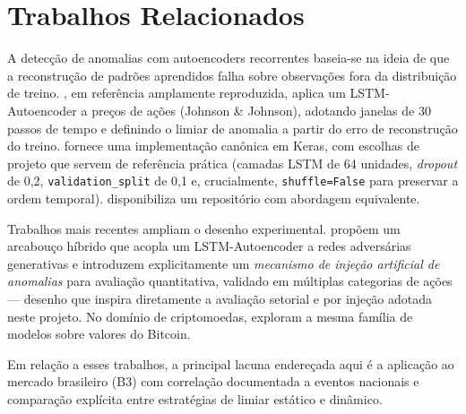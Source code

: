 \section{Trabalhos Relacionados}

A detecção de anomalias com autoencoders recorrentes baseia-se na ideia de que a
reconstrução de padrões aprendidos falha sobre observações fora da distribuição de
treino. \citet{li2020lstm}, em referência amplamente reproduzida, aplica um
LSTM-Autoencoder a preços de ações (Johnson \& Johnson), adotando janelas de 30 passos
de tempo e definindo o limiar de anomalia a partir do erro de reconstrução do treino.
\citet{valkov2019lstm} fornece uma implementação canônica em Keras, com escolhas de
projeto que servem de referência prática (camadas LSTM de 64 unidades, \emph{dropout}
de 0{,}2, \texttt{validation\_split} de 0{,}1 e, crucialmente, \texttt{shuffle=False}
para preservar a ordem temporal). \citet{petrovic2019lstm} disponibiliza um repositório
com abordagem equivalente.

Trabalhos mais recentes ampliam o desenho experimental. \citet{liu2025robust} propõem um
arcabouço híbrido que acopla um LSTM-Autoencoder a redes adversárias generativas e
introduzem explicitamente um \emph{mecanismo de injeção artificial de anomalias} para
avaliação quantitativa, validado em múltiplas categorias de ações --- desenho que
inspira diretamente a avaliação setorial e por injeção adotada neste projeto. No domínio
de criptomoedas, \citet{bitcoin2021anomaly} exploram a mesma família de modelos sobre
valores do Bitcoin.

Em relação a esses trabalhos, a principal lacuna endereçada aqui é a aplicação ao mercado
brasileiro (B3) com correlação documentada a eventos nacionais e comparação explícita
entre estratégias de limiar estático e dinâmico.

